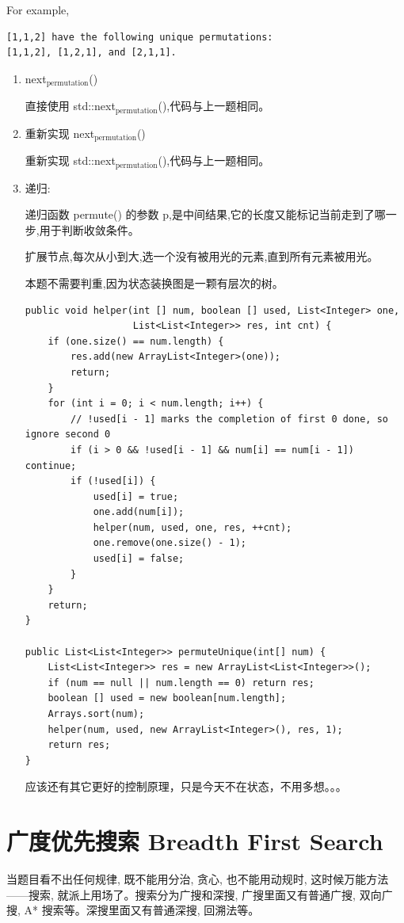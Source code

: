 \documentclass[12pt]{book}
\begin{document}
For example,
\lstset{language=java,label= ,caption= ,numbers=none}
\begin{lstlisting}
[1,1,2] have the following unique permutations:
[1,1,2], [1,2,1], and [2,1,1].
\end{lstlisting}

\begin{enumerate}
\item next$_{\text{permutation}}$()
\label{sec-9-2-1-1}

直接使用 std::next$_{\text{permutation}}$(),代码与上一题相同。
\item 重新实现 next$_{\text{permutation}}$()
\label{sec-9-2-1-2}

重新实现 std::next$_{\text{permutation}}$(),代码与上一题相同。
\item 递归:
\label{sec-9-2-1-3}

递归函数 permute() 的参数 p,是中间结果,它的长度又能标记当前走到了哪一步,用于判断收敛条件。

扩展节点,每次从小到大,选一个没有被用光的元素,直到所有元素被用光。

本题不需要判重,因为状态装换图是一颗有层次的树。

\lstset{language=java,label= ,caption= ,numbers=none}
\begin{lstlisting}
public void helper(int [] num, boolean [] used, List<Integer> one,
                   List<List<Integer>> res, int cnt) {
    if (one.size() == num.length) {
        res.add(new ArrayList<Integer>(one));
        return;
    }
    for (int i = 0; i < num.length; i++) {
        // !used[i - 1] marks the completion of first 0 done, so ignore second 0
        if (i > 0 && !used[i - 1] && num[i] == num[i - 1]) continue;
        if (!used[i]) {
            used[i] = true;
            one.add(num[i]);
            helper(num, used, one, res, ++cnt);
            one.remove(one.size() - 1);
            used[i] = false;
        }
    }
    return;
}

public List<List<Integer>> permuteUnique(int[] num) {
    List<List<Integer>> res = new ArrayList<List<Integer>>();
    if (num == null || num.length == 0) return res;
    boolean [] used = new boolean[num.length];
    Arrays.sort(num);
    helper(num, used, new ArrayList<Integer>(), res, 1);
    return res;
}
\end{lstlisting}

应该还有其它更好的控制原理，只是今天不在状态，不用多想。。。
\end{enumerate}

\chapter{广度优先搜索 Breadth First Search}
\label{sec-10}
当题目看不出任何规律, 既不能用分治, 贪心, 也不能用动规时, 这时候万能方法——搜索, 就派上用场了。搜索分为广搜和深搜, 广搜里面又有普通广搜, 双向广搜, A* 搜索等。深搜里面又有普通深搜, 回溯法等。
\end{document}
